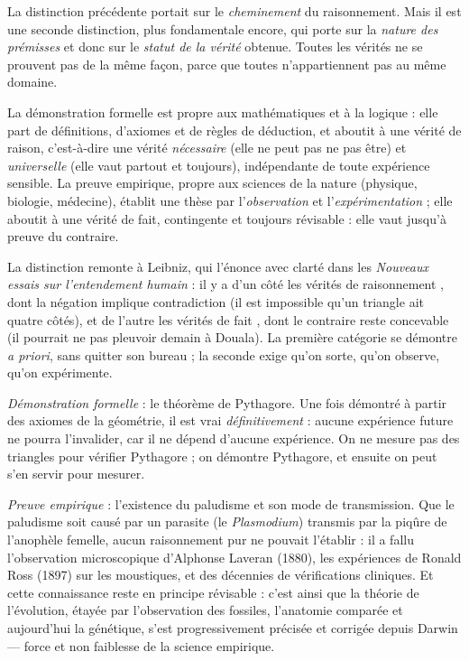 \documentclass[11pt]{article}
\newcommand{\cle}[1]{{\popxbold\color{popdark}#1}}
\newcounter{popsec}
\newcounter{popsub}
\newcommand{\courssub}[1]{%
  \stepcounter{popsub}%
  \par\vspace{9pt}\noindent{\popxbold\fontsize{11.5}{13}\selectfont\color{popink}{\color{poporange}\thepopsec.\thepopsub}\hspace{6pt}#1}\par\nopagebreak\vspace{4pt}
}
\begin{document}
\courssub{Démonstration formelle et preuve empirique}

La distinction précédente portait sur le \emph{cheminement} du raisonnement. Mais il est une seconde distinction, plus fondamentale encore, qui porte sur la \emph{nature des prémisses} et donc sur le \emph{statut de la vérité} obtenue. Toutes les vérités ne se prouvent pas de la même façon, parce que toutes n'appartiennent pas au même domaine.

\begin{definition}
La \cle{démonstration formelle} est propre aux mathématiques et à la logique : elle part de définitions, d'axiomes et de règles de déduction, et aboutit à une \cle{vérité de raison}, c'est-à-dire une vérité \emph{nécessaire} (elle ne peut pas ne pas être) et \emph{universelle} (elle vaut partout et toujours), indépendante de toute expérience sensible. La \cle{preuve empirique}, propre aux sciences de la nature (physique, biologie, médecine), établit une thèse par l'\emph{observation} et l'\emph{expérimentation} ; elle aboutit à une \cle{vérité de fait}, contingente et toujours révisable : elle vaut jusqu'à preuve du contraire.
\end{definition}

La distinction remonte à Leibniz, qui l'énonce avec clarté dans les \emph{Nouveaux essais sur l'entendement humain} : il y a d'un côté les \guillemotleft vérités de raisonnement \guillemotright, dont la négation implique contradiction (il est impossible qu'un triangle ait quatre côtés), et de l'autre les \guillemotleft vérités de fait \guillemotright, dont le contraire reste concevable (il pourrait ne pas pleuvoir demain à Douala). La première catégorie se démontre \emph{a priori}, sans quitter son bureau ; la seconde exige qu'on sorte, qu'on observe, qu'on expérimente.

\begin{exemplebox}
\emph{Démonstration formelle} : le théorème de Pythagore. Une fois démontré à partir des axiomes de la géométrie, il est vrai \emph{définitivement} : aucune expérience future ne pourra l'invalider, car il ne dépend d'aucune expérience. On ne mesure pas des triangles pour vérifier Pythagore ; on démontre Pythagore, et ensuite on peut s'en servir pour mesurer.

\emph{Preuve empirique} : l'existence du paludisme et son mode de transmission. Que le paludisme soit causé par un parasite (le \emph{Plasmodium}) transmis par la piqûre de l'anophèle femelle, aucun raisonnement pur ne pouvait l'établir : il a fallu l'observation microscopique d'Alphonse Laveran (1880), les expériences de Ronald Ross (1897) sur les moustiques, et des décennies de vérifications cliniques. Et cette connaissance reste en principe révisable : c'est ainsi que la théorie de l'évolution, étayée par l'observation des fossiles, l'anatomie comparée et aujourd'hui la génétique, s'est progressivement précisée et corrigée depuis Darwin — force et non faiblesse de la science empirique.
\end{exemplebox}
\end{document}
